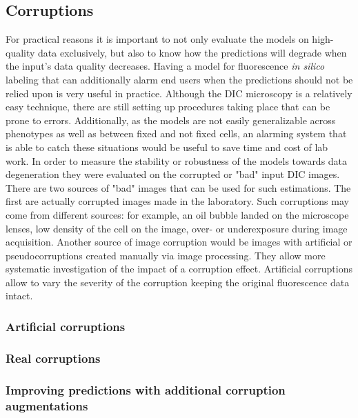 
\subsection{Corruptions}  
    For practical reasons it is important to not only evaluate the models on high-quality data exclusively, but also to know how the predictions will degrade when the input's data quality decreases. Having a model for fluorescence \textit{in silico} labeling that can additionally alarm end users when the predictions should not be relied upon is very useful in practice. Although the DIC microscopy is a relatively easy technique, there are still setting up procedures taking place that can be prone to errors. Additionally, as the models are not easily generalizable across phenotypes as well as between fixed and not fixed cells, an alarming system that is able to catch these situations would be useful to save time and cost of lab work. In order to measure the stability or robustness of the models towards data degeneration they were evaluated on the corrupted or "bad" input DIC images. There are two sources of "bad" images that can be used for such estimations. The first are actually corrupted images made in the laboratory. Such corruptions may come from different sources: for example, an oil bubble landed on the microscope lenses, low density of the cell on the image, over- or underexposure during image acquisition. Another source of image corruption would be images with artificial or pseudocorruptions created manually via image processing. They allow more systematic investigation of the impact of a corruption effect. Artificial corruptions allow to vary the severity of the corruption keeping the original fluorescence data intact.
    
    \subsubsection{Artificial corruptions}
        
    \subsubsection{Real corruptions}
        \label{section:real-corruptions}
        
    \subsubsection{Improving predictions with additional corruption augmentations}
        \label{section:augments-againts-corruptions}
        
